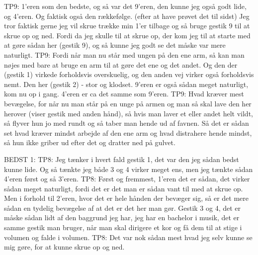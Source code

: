 TP9: 1’eren som den bedste, og så var det 9’eren, den kunne jeg også godt lide, og 4’eren. Og faktisk også den rækkefølge. (efter at have prøvet det til sidst) Jeg tror faktisk gerne jeg vil skrue trække min 1’er tilbage og så bruge gestik 9 til at skrue op og ned. Fordi da jeg skulle til at skrue op, der kom jeg til at starte med at gøre sådan her (gestik 9), og så kunne jeg godt se det måske var mere naturligt.
TP9: Fordi når man nu står med ungen på den ene arm, så kan man nøjes med bare at bruge en arm til at gøre det ene og det andet. Og den der (gestik 1) virkede forholdsvis overskuelig, og den anden vej virker også forholdsvis nemt. Den her (gestik 2) - stor og klodset. 9’eren er også sådan meget naturligt, kom nu op i gang. 4’eren er ca det samme som 9’eren. 
TP9: Hvad kræver mest bevægelse, for når nu man står på en unge på armen og man så skal lave den her herover (viser gestik med anden hånd), så hvis man laver et eller andet helt vildt, så flyver hun jo med rundt og så taber man hende ud af favnen. Så det er sådan set hvad kræver mindst arbejde af den ene arm og hvad distrahere hende mindst, så hun ikke griber ud efter det og dratter ned på gulvet. 





BEDST 1:
TP8: Jeg tænker i hvert fald gestik 1, det var den jeg sådan bedst kunne lide. Og så tænkte jeg både 3 og 4 virker meget ens, men jeg tænkte sådan 4’eren først og så 3’eren. 
TP8: Først og fremmest, 1’eren det er sådan, det virker sådan meget naturligt, fordi det er det man er sådan vant til med at skrue op. Men i forhold til 2’eren, hvor det er hele hånden der bevæger sig, så er det mere sådan en tydelig bevægelse af at det er det her man gør. Gestik 3 og 4, det er måske sådan lidt af den baggrund jeg har, jeg har en bachelor i musik, det er samme gestik man bruger, når man skal dirigere et kor og få dem til at stige i volumen og falde i volumen. 
TP8: Det var nok sådan mest hvad jeg selv kunne se mig gøre, for at kunne skrue op og ned. 


